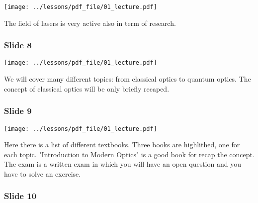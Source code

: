 \documentclass[../main/main.tex]{subfiles}
\begin{document}
\begin{minipage}[]{0.5\linewidth}
\centering
\texttt{[image: ../lessons/pdf\_file/01\_lecture.pdf]}
\end{minipage}
\hspace{0.3cm}\vspace{0.3cm}
\begin{minipage}[c]{0.47\linewidth}
The field of lasers is very active also in term of research.
\end{minipage}

\subsubsection*{Slide 8}

\begin{minipage}[]{0.5\linewidth}
\centering
\texttt{[image: ../lessons/pdf\_file/01\_lecture.pdf]}
\end{minipage}
\hspace{0.3cm}\vspace{0.3cm}
\begin{minipage}[c]{0.47\linewidth}
We will cover many different topics: from classical optics to quantum optics. The concept of classical optics will be only briefly recaped.
\end{minipage}

\subsubsection*{Slide 9}

\begin{minipage}[]{0.5\linewidth}
\centering
\texttt{[image: ../lessons/pdf\_file/01\_lecture.pdf]}
\end{minipage}
\hspace{0.3cm}\vspace{0.3cm}
\begin{minipage}[c]{0.47\linewidth}
Here there is a list of different textbooks. Three books are highlithed, one for each topic. "Introduction to Modern Optics" is a good book for recap the concept. The exam is a written exam in which you will have an open question and you have to solve an exercise.
\end{minipage}

\subsubsection*{Slide 10}
\end{document}
